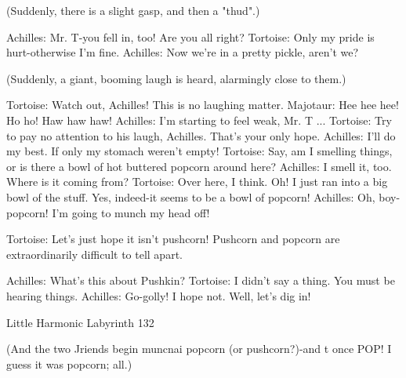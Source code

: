                      (Suddenly, there is a slight gasp, and then a "thud".)

               Achilles: Mr. T-you fell in, too! Are you all right?
               Tortoise: Only my pride is hurt-otherwise I'm fine.
               Achilles: Now we're in a pretty pickle, aren't we?

                      (Suddenly, a giant, booming laugh is heard, alarmingly close to
                     them.)

               Tortoise: Watch out, Achilles! This is no laughing matter.
               Majotaur: Hee hee hee! Ho ho! Haw haw haw!
               Achilles: I'm starting to feel weak, Mr. T ...
               Tortoise: Try to pay no attention to his laugh,
               Achilles. That's your only hope.
               Achilles: I'll do my best. If only my stomach weren't empty!
               Tortoise: Say, am I smelling things, or is there a bowl of hot buttered
                      popcorn around here? Achilles: I smell it, too. Where is it coming
                      from?
               Tortoise: Over here, I think. Oh! I just ran into a big bowl of the stuff.
                      Yes, indeed-it seems to be a bowl of popcorn!
               Achilles: Oh, boy-popcorn! I'm going to munch my head off!

        Tortoise: Let's just hope it isn't pushcorn! Pushcorn and popcorn are
               extraordinarily difficult to tell apart.

               Achilles: What's this about Pushkin?
               Tortoise: I didn't say a thing. You must be hearing things.
               Achilles: Go-golly! I hope not. Well, let's dig in!




Little Harmonic Labyrinth                                                            132

                  (And the two Jriends begin muncnai popcorn (or pushcorn?)-and t
                  once POP! I guess it was popcorn; all.)

